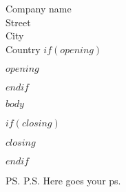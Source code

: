 \documentclass[11pt]{letter}
\begin{document}
\begin{letter}{Company name \\ Street\\ City\\ Country}
$if(opening)$
\opening{$opening$}
$endif$

\vspace{0.75cm}

$body$

\vspace{0.75cm}

$if(closing)$
\closing{$closing$}
$endif$


\ps{P.S. Here goes your ps.}
\end{letter}
\end{document}

